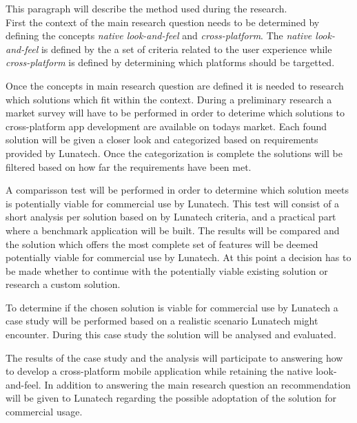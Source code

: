 
This paragraph will describe the method used during the research.\\

First the context of the main research question needs to be determined by defining the concepts \emph{native look-and-feel} and \emph{cross-platform}. The \emph{native look-and-feel} is defined by the a set of criteria related to the user experience while \emph{cross-platform} is defined by determining which platforms should be targetted.



Once the concepts in main research question are defined it is needed to research which solutions which fit within the context. During a preliminary research a market survey will have to be performed in order to deterime which solutions to cross-platform app development are available on todays market. Each found solution will be given a closer look and categorized based on requirements provided by Lunatech. Once the categorization is complete the solutions will be filtered based on how far the requirements have been met.

A comparisson test will be performed in order to determine which solution meets is potentially viable for commercial use by Lunatech. This test will consist of a short analysis per solution based on by Lunatech criteria, and a practical part where a benchmark application will be built. The results will be compared and the solution which offers the most complete set of features will be deemed potentially viable for commercial use by Lunatech. At this point a decision has to be made whether to continue with the potentially viable existing solution or research a custom solution. 

To determine if the chosen solution is viable for commercial use by Lunatech a case study will be performed based on a realistic scenario Lunatech might encounter. During this case study the solution will be analysed and evaluated.

The results of the case study and the analysis will participate to answering how to develop a cross-platform mobile application while retaining the native look-and-feel. In addition to answering the main research question an recommendation will be given to Lunatech regarding the possible adoptation of the solution for commercial usage.

